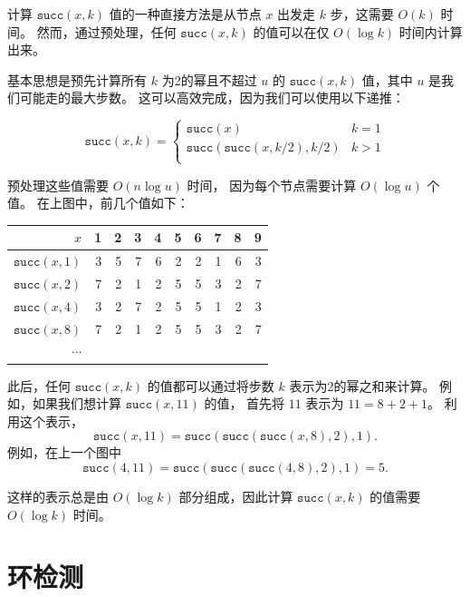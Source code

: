 计算 $\texttt{succ}(x,k)$ 值的一种直接方法是从节点 $x$ 出发走 $k$ 步，这需要 $O(k)$ 时间。
然而，通过预处理，任何 $\texttt{succ}(x,k)$ 的值可以在仅 $O(\log k)$ 时间内计算出来。

基本思想是预先计算所有 $k$ 为2的幂且不超过 $u$ 的 $\texttt{succ}(x,k)$ 值，其中 $u$ 是我们可能走的最大步数。
这可以高效完成，因为我们可以使用以下递推：

\begin{equation*}
    \texttt{succ}(x,k) = \begin{cases}
               \texttt{succ}(x)              & k = 1\\
               \texttt{succ}(\texttt{succ}(x,k/2),k/2)   & k > 1\\
           \end{cases}
\end{equation*}

预处理这些值需要 $O(n \log u)$ 时间，
因为每个节点需要计算 $O(\log u)$ 个值。
在上图中，前几个值如下：

\begin{center}
\begin{tabular}{r|rrrrrrrrr}
$x$ & 1 & 2 & 3 & 4 & 5 & 6 & 7 & 8 & 9 \\
\hline
$\texttt{succ}(x,1)$ & 3 & 5 & 7 & 6 & 2 & 2 & 1 & 6 & 3 \\
$\texttt{succ}(x,2)$ & 7 & 2 & 1 & 2 & 5 & 5 & 3 & 2 & 7 \\
$\texttt{succ}(x,4)$ & 3 & 2 & 7 & 2 & 5 & 5 & 1 & 2 & 3 \\
$\texttt{succ}(x,8)$ & 7 & 2 & 1 & 2 & 5 & 5 & 3 & 2 & 7 \\
$\cdots$ \\
\end{tabular}
\end{center}

此后，任何 $\texttt{succ}(x,k)$ 的值都可以通过将步数 $k$ 表示为2的幂之和来计算。
例如，如果我们想计算 $\texttt{succ}(x,11)$ 的值，
首先将 $11$ 表示为 $11=8+2+1$。
利用这个表示，
\[\texttt{succ}(x,11)=\texttt{succ}(\texttt{succ}(\texttt{succ}(x,8),2),1).\]
例如，在上一个图中
\[\texttt{succ}(4,11)=\texttt{succ}(\texttt{succ}(\texttt{succ}(4,8),2),1)=5.\]

这样的表示总是由 $O(\log k)$ 部分组成，因此计算 $\texttt{succ}(x,k)$ 的值需要 $O(\log k)$ 时间。

\section{环检测}

